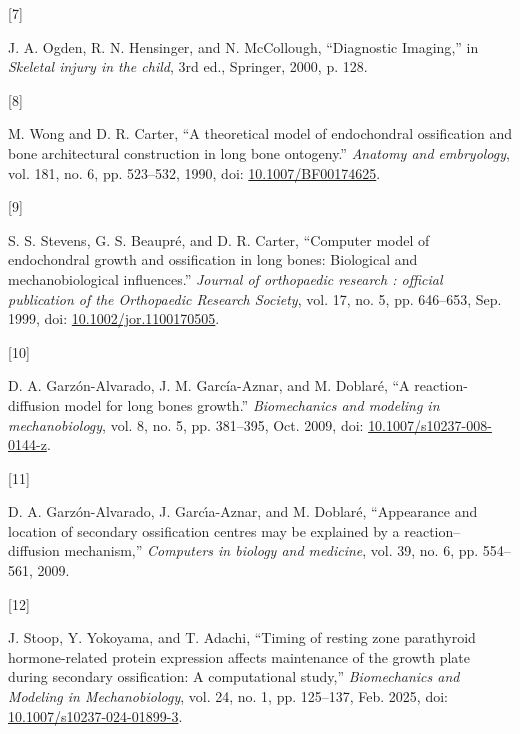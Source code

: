 \documentclass[
  letterpaper,
  DIV=11,
  numbers=noendperiod]{scrartcl}
\newlength{\cslhangindent}
\newlength{\csllabelwidth}
\newenvironment{CSLReferences}[2] %
 {\begin{list}{}{%
  \setlength{\itemindent}{0pt}
  \setlength{\leftmargin}{0pt}
  \setlength{\parsep}{0pt}
  \ifodd #1
   \setlength{\leftmargin}{\cslhangindent}
   \setlength{\itemindent}{-1\cslhangindent}
  \fi
  \setlength{\itemsep}{#2\baselineskip}}}
 {\end{list}}
\newcommand{\CSLLeftMargin}[1]{\parbox[t]{\csllabelwidth}{\strut#1\strut}}
\newcommand{\CSLRightInline}[1]{\parbox[t]{\linewidth - \csllabelwidth}{\strut#1\strut}}
\begin{document}
\begin{CSLReferences}{0}{0}
\CSLLeftMargin{{[}7{]} }%
\CSLRightInline{J. A. Ogden, R. N. Hensinger, and N. McCollough,
{``Diagnostic {Imaging},''} in \emph{Skeletal injury in the child}, 3rd
ed., Springer, 2000, p. 128.}

\CSLLeftMargin{{[}8{]} }%
\CSLRightInline{M. Wong and D. R. Carter, {``A theoretical model of
endochondral ossification and bone architectural construction in long
bone ontogeny.''} \emph{Anatomy and embryology}, vol. 181, no. 6, pp.
523--532, 1990, doi:
\href{https://doi.org/10.1007/BF00174625}{10.1007/BF00174625}.}

\CSLLeftMargin{{[}9{]} }%
\CSLRightInline{S. S. Stevens, G. S. Beaupré, and D. R. Carter,
{``Computer model of endochondral growth and ossification in long bones:
Biological and mechanobiological influences.''} \emph{Journal of
orthopaedic research : official publication of the Orthopaedic Research
Society}, vol. 17, no. 5, pp. 646--653, Sep. 1999, doi:
\href{https://doi.org/10.1002/jor.1100170505}{10.1002/jor.1100170505}.}

\CSLLeftMargin{{[}10{]} }%
\CSLRightInline{D. A. Garzón-Alvarado, J. M. García-Aznar, and M.
Doblaré, {``A reaction-diffusion model for long bones growth.''}
\emph{Biomechanics and modeling in mechanobiology}, vol. 8, no. 5, pp.
381--395, Oct. 2009, doi:
\href{https://doi.org/10.1007/s10237-008-0144-z}{10.1007/s10237-008-0144-z}.}

\CSLLeftMargin{{[}11{]} }%
\CSLRightInline{D. A. Garzón-Alvarado, J. Garcı́a-Aznar, and M. Doblaré,
{``Appearance and location of secondary ossification centres may be
explained by a reaction--diffusion mechanism,''} \emph{Computers in
biology and medicine}, vol. 39, no. 6, pp. 554--561, 2009.}

\CSLLeftMargin{{[}12{]} }%
\CSLRightInline{J. Stoop, Y. Yokoyama, and T. Adachi, {``Timing of
resting zone parathyroid hormone-related protein expression affects
maintenance of the growth plate during secondary ossification: A
computational study,''} \emph{Biomechanics and Modeling in
Mechanobiology}, vol. 24, no. 1, pp. 125--137, Feb. 2025, doi:
\href{https://doi.org/10.1007/s10237-024-01899-3}{10.1007/s10237-024-01899-3}.}


\end{CSLReferences}
\end{document}
